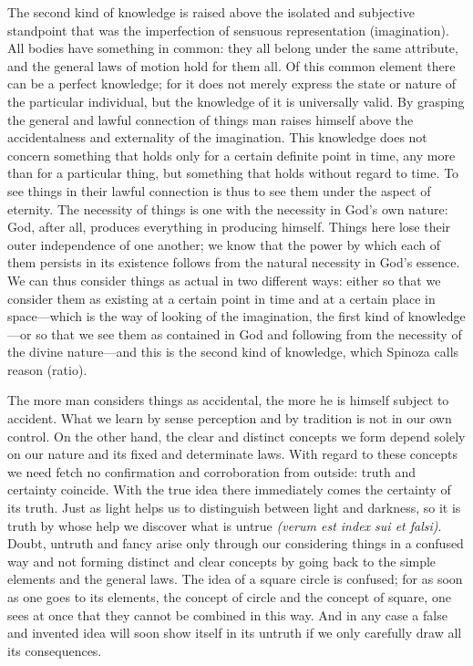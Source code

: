 \documentclass[12pt]{book}
\newcommand{\opage}[1]{\marginnote{\footnotesize\textit{[#1]}}}
\begin{document}
The second kind of knowledge is raised above the isolated and subjective standpoint
that was the imperfection of sensuous representation (imagination). All bodies have
something in common: they all belong under the same attribute, and the general laws of
motion hold for them all. Of this common element there can be a perfect knowledge; for
it does not merely express the state or nature of the particular individual, but the
knowledge of it is universally valid. By grasping the general and lawful connection of
things man raises himself above the accidentalness and externality of the imagination.
This knowledge does not concern something that holds only for a certain definite point
in time, any more than for a particular thing, but something that holds without regard
to time. To see things in their lawful connection is \opage{108}thus to see them under
the aspect of eternity. The necessity of things is one with the necessity in God's own
nature: God, after all, produces everything in producing himself. Things here lose
their outer independence of one another; we know that the power by which each of them
persists in its existence follows from the natural necessity in God's essence. We can
thus consider things as actual in two different ways: either so that we consider them
as existing at a certain point in time and at a certain place in space---which is the
way of looking of the imagination, the first kind of knowledge---or so that we see them
as contained in God and following from the necessity of the divine nature---and this is
the second kind of knowledge, which Spinoza calls reason (ratio).

The more man considers things as accidental, the more he is himself subject to
accident. What we learn by sense perception and by tradition is not in our own control.
On the other hand, the clear and distinct concepts we form depend solely on our nature
and its fixed and determinate laws. With regard to these concepts we need fetch no
confirmation and corroboration from outside: truth and certainty coincide. With the
true idea there immediately comes the certainty of its truth. Just as light helps us to
distinguish between light and darkness, so it is truth by whose help we discover what
is untrue \textit{(verum est index sui et falsi)}. Doubt, untruth and fancy arise only
through our considering things in a confused way and not forming distinct and clear
concepts by going back to the simple elements and the general laws. The idea of
\opage{109}a square circle is confused; for as soon as one goes to its elements, the
concept of circle and the concept of square, one sees at once that they cannot be
combined in this way. And in any case a false and invented idea will soon show itself
in its untruth if we only carefully draw all its consequences.
\end{document}
